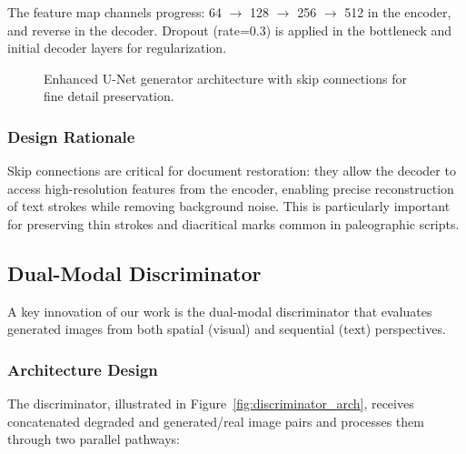 \documentclass[journal]{IEEEtran}
\begin{document}
The feature map channels progress: 64 $\rightarrow$ 128 $\rightarrow$ 256 $\rightarrow$ 512 in the encoder, and reverse in the decoder. Dropout (rate=0.3) is applied in the bottleneck and initial decoder layers for regularization.

\begin{figure}[!t]
\centering
\caption{Enhanced U-Net generator architecture with skip connections for fine detail preservation.}
\label{fig:unet_architecture}
\end{figure}

\subsubsection{Design Rationale}

Skip connections are critical for document restoration: they allow the decoder to access high-resolution features from the encoder, enabling precise reconstruction of text strokes while removing background noise. This is particularly important for preserving thin strokes and diacritical marks common in paleographic scripts.

\subsection{Dual-Modal Discriminator}

A key innovation of our work is the dual-modal discriminator that evaluates generated images from both spatial (visual) and sequential (text) perspectives.

\subsubsection{Architecture Design}

The discriminator, illustrated in Figure~\ref{fig:discriminator_arch}, receives concatenated degraded and generated/real image pairs and processes them through two parallel pathways:
\end{document}
